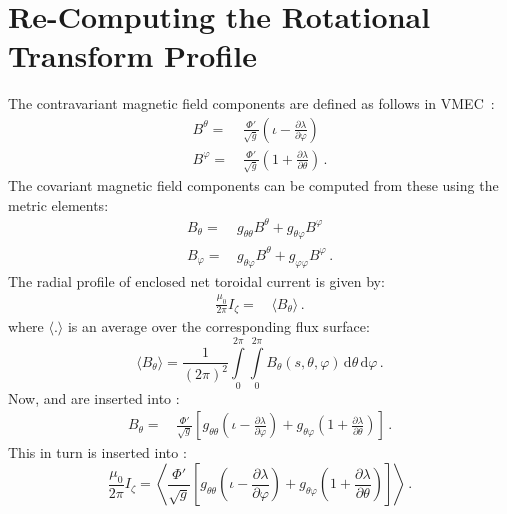 \section{Re-Computing the Rotational Transform Profile}
The contravariant magnetic field components are defined as follows in VMEC~\cite{lee_1988}:
\begin{align}
 B^{\theta}  =&\, \frac{\Phi'}{\sqrt{g}} \left( \iota - \frac{\partial \lambda}{\partial \varphi} \right) \label{eqn:bsupu} \\
 B^{\varphi} =&\, \frac{\Phi'}{\sqrt{g}} \left(    1  + \frac{\partial \lambda}{\partial \theta } \right) \label{eqn:bsupv} \, .
\end{align}
The covariant magnetic field components can be computed from these using the metric elements:
\begin{align}
 B_{\theta } =&\, g_{\theta  \theta} B^{\theta} + g_{\theta  \varphi} B^{\varphi} \label{eqn:bsubu} \\
 B_{\varphi} =&\, g_{\theta \varphi} B^{\theta} + g_{\varphi \varphi} B^{\varphi} \label{eqn:bsubv} \, .
\end{align}
The radial profile of enclosed net toroidal current is given by:
\begin{align}
 \frac{\mu_0}{2 \pi} I_\zeta
 =&\, \langle B_\theta \rangle \label{eqn:curtor} \, .
\end{align}
where $\langle . \rangle$ is an average over the corresponding flux surface:
\begin{equation}
 \langle B_\theta \rangle = \frac{1}{(2 \pi)^2} \int\limits_{0}^{2 \pi} \int\limits_{0}^{2 \pi}
        B_\theta(s, \theta, \varphi) \,\mathrm{d}\theta \,\mathrm{d}\varphi \, .
\end{equation}
%
Now,  and  are inserted into :
\begin{align}
 B_{\theta } =&\, \frac{\Phi'}{\sqrt{g}} \left[
       g_{\theta  \theta}  \left( \iota - \frac{\partial \lambda}{\partial \varphi} \right)
     + g_{\theta  \varphi} \left(    1  + \frac{\partial \lambda}{\partial \theta } \right) \right] \, .
\end{align}
This in turn is inserted into :
\begin{equation}
 \frac{\mu_0}{2 \pi} I_\zeta
 = \left\langle
     \frac{\Phi'}{\sqrt{g}} \left[
       g_{\theta  \theta}  \left( \iota - \frac{\partial \lambda}{\partial \varphi} \right)
     + g_{\theta  \varphi} \left(    1  + \frac{\partial \lambda}{\partial \theta } \right) \right] \right\rangle \, .
\end{equation}
